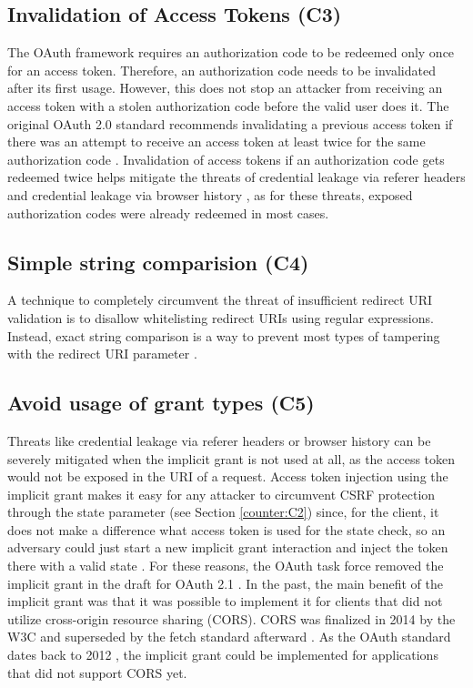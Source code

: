 \subsection[Invalidation of Access Tokens]{Invalidation of Access Tokens (C3)}
\label{counter:C3}
The OAuth framework requires an authorization code to be redeemed only once for an access token. Therefore, an authorization code needs to be invalidated after its first usage. However, this does not stop an attacker from receiving an access token with a stolen authorization code before the valid user does it. The original OAuth 2.0 standard recommends invalidating a previous access token if there was an attempt to receive an access token at least twice for the same authorization code \cite{hardt2012rfc}. Invalidation of access tokens if an authorization code gets redeemed twice helps mitigate the threats of credential leakage via referer headers and credential leakage via browser history \cite{lodderstedt2020oauth}, as for these threats, exposed authorization codes were already redeemed in most cases.

\subsection[Simple String Comparision]{Simple string comparision (C4)}
\label{counter:C4}
A technique to completely circumvent the threat of insufficient redirect URI validation is to disallow whitelisting redirect URIs using regular expressions. Instead, exact string comparison is a way to prevent most types of tampering with the redirect URI parameter \cite{lodderstedt2020oauth}.

\subsection[Avoid Usage of Grant Types]{Avoid usage of grant types (C5)}
\label{counter:C5}
Threats like credential leakage via referer headers or browser history can be severely mitigated when the implicit grant is not used at all, as the access token would not be exposed in the URI of a request. Access token injection using the implicit grant makes it easy for any attacker to circumvent CSRF protection through the state parameter (see Section \ref{counter:C2}) since, for the client, it does not make a difference what access token is used for the state check, so an adversary could just start a new implicit grant interaction and inject the token there with a valid state \cite{lodderstedt2020oauth}. For these reasons, the OAuth task force removed the implicit grant in the draft for OAuth 2.1 \cite{hardt2023rfc}. In the past, the main benefit of the implicit grant was that it was possible to implement it for clients that did not utilize cross-origin resource sharing (CORS). CORS was finalized in 2014 by the W3C and superseded by the fetch standard afterward \cite{vanKesteren2014}. As the OAuth standard dates back to 2012 \cite{hardt2012rfc}, the implicit grant could be implemented for applications that did not support CORS yet.

